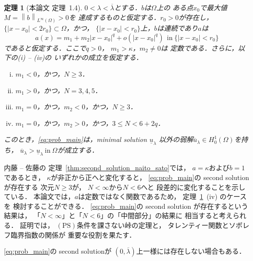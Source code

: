 \documentclass{jsarticle}
\theoremstyle{plain}
\newtheorem{thm}{定理}
\renewcommand{\bar}[1]{\overline{#1}}
\newcommand{\tin}{\text{in}~}
\begin{document}
\begin{thm}[本論文 定理~1.4] \label{thm:second_solution}
 $0 < \lambda < \bar{\lambda}$とする．$b$は$\Omega$上の
 ある点$x_0$で最大値$M = \left\| b \right\|_{L^\infty(\Omega)} > 0$を
 達成するものと仮定する．$r_0 > 0$が存在し，
 $\{ \lvert x - x_0 \rvert < 2r_0 \} \subset \Omega$，かつ，
 $\{ \lvert x - x_0 \rvert < r_0 \}$上，$b$は連続であり$a$は
 \begin{equation}
  a(x) = m_1 + m_2 \lvert x-x_0 \rvert^{q} 
  + o(\lvert x-x_0 \rvert^{q}) \ \ \tin \{ \lvert x - x_0 \rvert < r_0
  \}  \label{eq:a_q}
 \end{equation}
 であると仮定する．ここで$q > 0$，
 $m_1 > \kappa$，$m_2 \neq 0$は
 定数である．さらに，以下の(i) -- (iv)の
 いずれかの成立を仮定する．
 \begin{enumerate}[(i)]
  \item $m_1 < 0$，かつ，$N \geq 3$．
  \item $m_1 > 0$，かつ，$N = 3, 4, 5$．
  \item $m_1 = 0$，かつ，$m_2 < 0$，かつ，$N \geq 3$．
  \item $m_1 = 0$，かつ，$m_2 > 0$，かつ，$3 \leq N < 6 + 2q$．
 \end{enumerate}
 このとき，\ref{eq:prob_main}は，minimal solution
 $\underline{u}_\lambda$
 以外の弱解$\bar{u}_\lambda \in H_0^1(\Omega)$を持ち，
 $\bar{u}_\lambda >
 \underline{u}_\lambda ~\tin \Omega$が成立する．
\end{thm}

内藤 -- 佐藤の
定理~\ref{thm:second_solution_naito_sato}では，
$a = \kappa$および$b = 1$であるとき，
$\kappa$が非正から正へと変化すると，
\ref{eq:prob_main}の second solution が存在する
次元$N \geq 3$が，
$N < \infty$から$N < 6$へと
段差的に変化することを示している．
本論文では，$a$は定数ではなく関数であるため，
定理~\ref{thm:second_solution}~(iv) のケースを
検討することができる．
\ref{eq:prob_main}の second solution が存在するという結果は，
「$N < \infty$」と「$N < 6$」の「中間部分」の結果に
相当すると考えられる．
証明では，
$(\mathrm{PS})$条件を課さない峠の定理と，
タレンティー関数とソボレフ臨界指数の関係が
重要な役割を果たす．

\ref{eq:prob_main}の second solutionが
$(0, \bar{\lambda})$上一様には存在しない場合もある．
\end{document}
